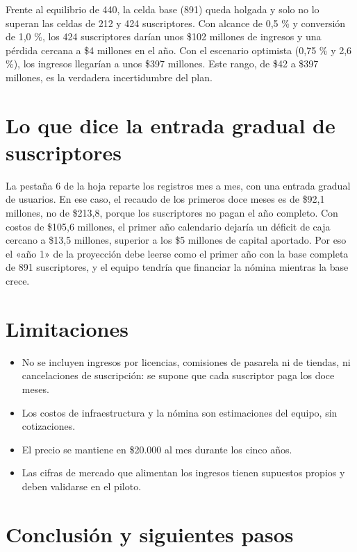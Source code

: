 \documentclass[11pt,a4paper]{article}
\begin{document}
Frente al equilibrio de 440, la celda base (891) queda holgada y solo no lo superan las celdas de 212 y 424 suscriptores. Con alcance de 0,5 \% y conversión de 1,0 \%, los 424 suscriptores darían unos \$102 millones de ingresos y una pérdida cercana a \$4 millones en el año. Con el escenario optimista (0,75 \% y 2,6 \%), los ingresos llegarían a unos \$397 millones. Este rango, de \$42 a \$397 millones, es la verdadera incertidumbre del plan.

\section{Lo que dice la entrada gradual de suscriptores}

La pestaña 6 de la hoja reparte los registros mes a mes, con una entrada gradual de usuarios. En ese caso, el recaudo de los primeros doce meses es de \$92,1 millones, no de \$213,8, porque los suscriptores no pagan el año completo. Con costos de \$105,6 millones, el primer año calendario dejaría un déficit de caja cercano a \$13,5 millones, superior a los \$5 millones de capital aportado. Por eso el «año 1» de la proyección debe leerse como el primer año con la base completa de 891 suscriptores, y el equipo tendría que financiar la nómina mientras la base crece.

\section{Limitaciones}

\begin{itemize}[leftmargin=1.5em]
  \item No se incluyen ingresos por licencias, comisiones de pasarela ni de tiendas, ni cancelaciones de suscripción: se supone que cada suscriptor paga los doce meses.
  \item Los costos de infraestructura y la nómina son estimaciones del equipo, sin cotizaciones.
  \item El precio se mantiene en \$20.000 al mes durante los cinco años.
  \item Las cifras de mercado que alimentan los ingresos tienen supuestos propios y deben validarse en el piloto.
\end{itemize}

\section{Conclusión y siguientes pasos}
\end{document}
